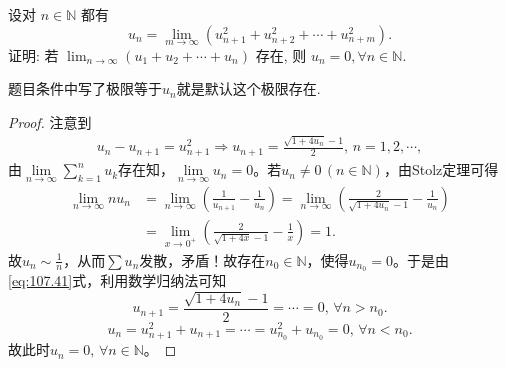 \documentclass[../../main.tex]{subfiles}
\begin{document}
\begin{example}
设对 \( n \in \mathbb{N} \) 都有
\[
u_n = \lim_{m \to \infty} (u_{n+1}^2 + u_{n+2}^2 + \cdots + u_{n+m}^2).
\]
证明: 若 \( \lim_{n \to \infty} (u_1 + u_2 + \cdots + u_n) \) 存在, 则 \( u_n = 0, \forall n \in \mathbb{N} \).
\end{example}
\begin{remark}
题目条件中写了极限等于$u_n$就是默认这个极限存在.
\end{remark}
\begin{proof}
注意到
\begin{align}
u_n - u_{n+1} = u_{n+1}^2 \Longrightarrow u_{n+1} = \frac{\sqrt{1 + 4u_n} - 1}{2}, \, n = 1, 2, \cdots, \label{eq:107.41}
\end{align}
由$\lim\limits_{n \to \infty} \sum_{k=1}^n u_k$存在知，$\lim\limits_{n \to \infty} u_n = 0$。若$u_n \neq 0 \, (n \in \mathbb{N})$，由Stolz定理可得
\begin{align*}
\lim_{n \to \infty} n u_n &= \lim_{n \to \infty} \left( \frac{1}{u_{n+1}} - \frac{1}{u_n} \right) = \lim_{n \to \infty} \left( \frac{2}{\sqrt{1 + 4u_n} - 1} - \frac{1}{u_n} \right) \\
&= \lim_{x \to 0^+} \left( \frac{2}{\sqrt{1 + 4x} - 1} - \frac{1}{x} \right) = 1.
\end{align*}
故$u_n \sim \frac{1}{n}$，从而$\sum u_n$发散，矛盾！故存在$n_0 \in \mathbb{N}$，使得$u_{n_0} = 0$。于是由\eqref{eq:107.41}式，利用数学归纳法可知
\[
u_{n+1} = \frac{\sqrt{1 + 4u_n} - 1}{2} = \cdots = 0, \, \forall n > n_0.
\]
\[
u_n = u_{n+1}^2 + u_{n+1} = \cdots = u_{n_0}^2 + u_{n_0} = 0, \, \forall n < n_0.
\]
故此时$u_n = 0, \, \forall n \in \mathbb{N}$。
\end{proof}
\end{document}
